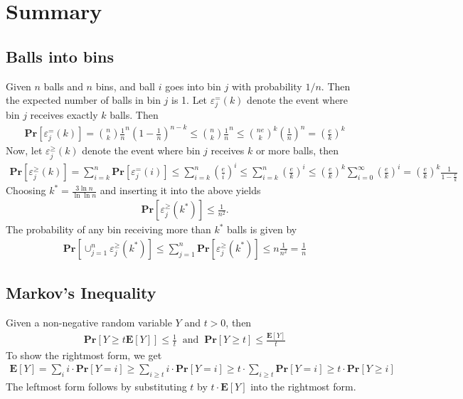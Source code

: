 \documentclass[12pt]{article}
\begin{document}
\pagebreak

\section{Summary}
\subsection{Balls into bins}
Given $n$ balls and $n$ bins, and ball $i$ goes into bin $j$ with probability $1/n$. Then the expected number of balls in bin $j$ is 1. Let $\varepsilon^=_j(k)$ denote the event where bin $j$ receives exactly $k$ balls. Then
\begin{align*}
\mathbf{Pr}\left[ \varepsilon^=_j(k) \right] = \binom{n}{k}\frac{1}{n}^n \left( 1-\frac{1}{n} \right)^{n-k} \leq \binom{n}{k}\frac{1}{n}^n \leq \binom{ne}{k}^k \left( \frac{1}{n} \right)^n = \left(\frac{e}{k}\right)^k 
\end{align*}
Now, let $\varepsilon^\geq_j(k)$ denote the event where bin $j$ receives $k$ or more balls, then
\begin{align*}
\mathbf{Pr}\left[ \varepsilon^\geq_j(k) \right] = \sum_{i=k}^{n} \mathbf{Pr}\left[ \varepsilon^=_j(i) \right] \leq \sum_{i=k}^{n} \left(\frac{e}{i}\right)^i \leq \sum_{i=k}^{n} \left(\frac{e}{k}\right)^i \leq \left(\frac{e}{k}\right)^k \sum_{i=0}^{\infty} \left( \frac{e}{k} \right)^i = \left( \frac{e}{k} \right)^k \frac{1}{1-\frac{e}{k}}
\end{align*}
Choosing $k^*=\frac{3 \ln n}{\ln \ln n}$ and inserting it into the above yields
\begin{align*}
\mathbf{Pr}\left[ \varepsilon_j^\geq(k^*) \right] \leq \frac{1}{n^2}.
\end{align*}
The probability of any bin receiving more than $k^*$ balls is given by
\begin{align*}
\mathbf{Pr}\left[ \cup_{j=1}^{n} \varepsilon_j^\geq(k^*) \right] \leq \sum_{j=1}^n \mathbf{Pr}\left[ \varepsilon_j^\geq(k^*) \right] \leq n \frac{1}{n^2} = \frac{1}{n}
\end{align*}

\subsection{Markov's Inequality}
Given a non-negative random variable $Y$ and $t > 0$, then
\begin{align*}
\mathbf{Pr}\left[ Y \geq t \mathbf{E}\left[ Y \right] \right] \leq \frac{1}{t} \;\; \mathrm{ and } \;\; \mathbf{Pr}\left[ Y \geq t \right] \leq \frac{\mathbf{E}\left[ Y \right]}{t}
\end{align*}
To show the rightmost form, we get
\begin{align*}
\mathbf{E}\left[ Y \right] = \sum_{i} i \cdot \mathbf{Pr}\left[ Y=i \right] \geq \sum_{i \geq t} i \cdot \mathbf{Pr}\left[ Y=i \right] \geq t \cdot \sum_{i \geq t} \mathbf{Pr}\left[ Y=i \right] \geq t \cdot \mathbf{Pr}\left[ Y \geq i \right] 
\end{align*}
The leftmost form follows by substituting $t$ by $t \cdot \mathbf{E}\left[ Y \right]$ into the rightmost form.
\end{document}
